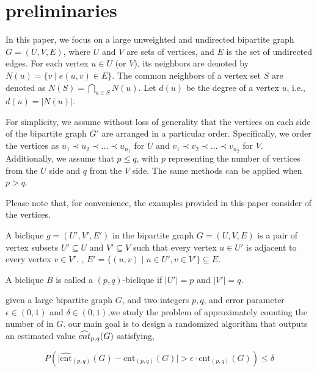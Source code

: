 \section{preliminaries}

In this paper, we focus on a large unweighted and undirected bipartite graph $G = (U, V, E)$, where $U$ and $V$ are sets of vertices, and $E$ is the set of undirected edges. For each vertex $u \in U$ (or $V$), its neighbors are denoted by $N(u) = \{v \mid e(u,v) \in E\}$. The common neighbors of a vertex set $S$ are denoted as $N(S) = \bigcap_{u \in S} N(u)$. Let $d(u)$ be the degree of a vertex $u$, i.e., $d(u) = |N(u)|$.

For simplicity, we assume without loss of generality that the vertices on each side of the bipartite graph $G'$ are arranged in a particular order. Specifically, we order the vertices as $u_1 \prec u_2 \prec \dots \prec u_{n_1}$ for $U$ and $v_1 \prec v_2 \prec \dots \prec v_{n_2}$ for $V$. Additionally, we assume that $p \leq q$, with $p$ representing the number of vertices from the $U$ side and $q$ from the $V$ side. The same methods can be applied when $p > q$.

Please note that, for convenience, the examples provided in this paper consider  of the vertices.

\begin{definition}[Biclique]
A biclique $g=(U',V',E')$ in the bipartite graph $G = (U, V, E)$ is a pair of vertex subsets $U' \subseteq U$ and $V' \subseteq V$ such that every vertex $u \in U'$ is adjacent to every vertex $v \in V'$. \ie,
$E' = \{ (u, v) \mid u \in U', v \in V' \} \subseteq E$.

\end{definition}

A biclique $B$ is called a $(p,q)$-biclique if $|U'|=p$ and $|V'|=q$.

 given a large bipartite graph $G$, and two integers $p,q$, and error parameter $\epsilon \in (0,1)$ and $\delta \in (0,1)$,we study the problem of approximately counting the number of \bicliques in $G$. \ie  our main goal is to design a randomized algorithm that outputs an estimated value ${\widehat{cnt}_{p,q}(G) }$ satisfying,

\[
P \left(\Big|\widehat{\text{cnt}}_{(p,q)}(G) - \text{cnt}_{(p,q)}(G)\Big| > \epsilon \cdot \text{cnt}_{(p,q)}(G)\right) \leq \delta
\]




\\

